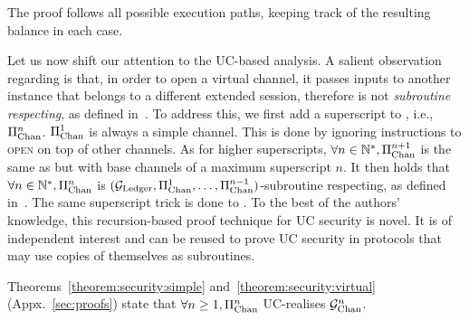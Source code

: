   The proof follows all possible execution paths, keeping track of the
  resulting balance in each case.


  Let us now shift our attention to the UC-based analysis. A salient observation
  regarding \pchan is that, in order to
  open a virtual channel, it passes inputs to another \pchan instance that
  belongs to a different extended session, therefore \pchan is not
  \emph{subroutine respecting}, as defined in~\cite{uc}. To
  address this, we first add a superscript to \pchan, i.e.,
  $\Pi_{\mathrm{Chan}}^{n}$. $\Pi_{\mathrm{Chan}}^{1}$ is always a simple channel.
  This is done by ignoring instructions to \textsc{open} on top of other
  channels. As for higher superscripts, $\forall n \in
  \mathbb{N}^*, \Pi_{\mathrm{Chan}}^{n+1}$ is the same as \pchan but with
  base channels of a maximum superscript $n$. It then holds that $\forall
  n \in \mathbb{N}^*, \Pi_{\mathrm{Chan}}^{n}$ is $(\mathcal{G}_{\mathrm{Ledger}}, \Pi_{\mathrm{Chan}}^{1}, \dots,
  \Pi_{\mathrm{Chan}}^{n-1})$-subroutine respecting, as defined
  in~\cite{DBLP:conf/tcc/BadertscherCHTZ20}. The same superscript trick is done
  to \fchan. To
  the best of the authors' knowledge, this recursion-based proof technique for
  UC security is novel. It is of independent interest and can be reused to prove
  UC security in protocols that may use copies of themselves as subroutines.

  Theorems~\ref{theorem:security:simple} and~\ref{theorem:security:virtual}
  (Appx.~\ref{sec:proofs}) state
  that $\forall n \geq 1, \Pi_{\mathrm{Chan}}^{n}$ UC-realises $\mathcal{G}_{\mathrm{Chan}}^{n}$.
